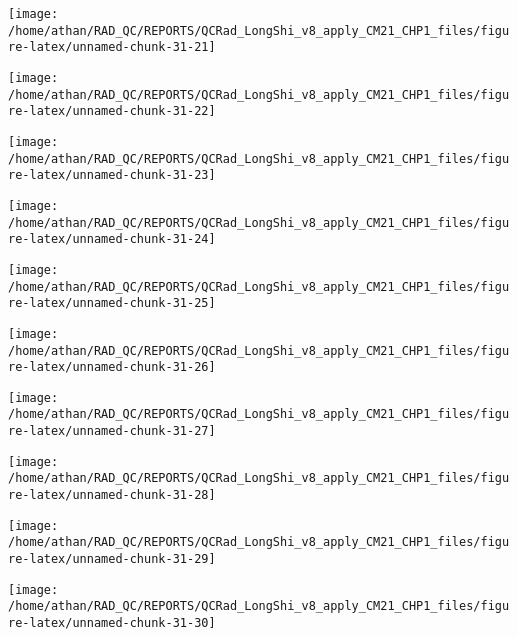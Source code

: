 \documentclass[
  10pt,
  a4paper,oneside]{article}
\begin{document}
\begin{center}\texttt{[image: /home/athan/RAD\_QC/REPORTS/QCRad\_LongShi\_v8\_apply\_CM21\_CHP1\_files/figure-latex/unnamed-chunk-31-21]} \end{center}

\begin{center}\texttt{[image: /home/athan/RAD\_QC/REPORTS/QCRad\_LongShi\_v8\_apply\_CM21\_CHP1\_files/figure-latex/unnamed-chunk-31-22]} \end{center}

\begin{center}\texttt{[image: /home/athan/RAD\_QC/REPORTS/QCRad\_LongShi\_v8\_apply\_CM21\_CHP1\_files/figure-latex/unnamed-chunk-31-23]} \end{center}

\begin{center}\texttt{[image: /home/athan/RAD\_QC/REPORTS/QCRad\_LongShi\_v8\_apply\_CM21\_CHP1\_files/figure-latex/unnamed-chunk-31-24]} \end{center}

\begin{center}\texttt{[image: /home/athan/RAD\_QC/REPORTS/QCRad\_LongShi\_v8\_apply\_CM21\_CHP1\_files/figure-latex/unnamed-chunk-31-25]} \end{center}

\begin{center}\texttt{[image: /home/athan/RAD\_QC/REPORTS/QCRad\_LongShi\_v8\_apply\_CM21\_CHP1\_files/figure-latex/unnamed-chunk-31-26]} \end{center}

\begin{center}\texttt{[image: /home/athan/RAD\_QC/REPORTS/QCRad\_LongShi\_v8\_apply\_CM21\_CHP1\_files/figure-latex/unnamed-chunk-31-27]} \end{center}

\begin{center}\texttt{[image: /home/athan/RAD\_QC/REPORTS/QCRad\_LongShi\_v8\_apply\_CM21\_CHP1\_files/figure-latex/unnamed-chunk-31-28]} \end{center}

\begin{center}\texttt{[image: /home/athan/RAD\_QC/REPORTS/QCRad\_LongShi\_v8\_apply\_CM21\_CHP1\_files/figure-latex/unnamed-chunk-31-29]} \end{center}

\begin{center}\texttt{[image: /home/athan/RAD\_QC/REPORTS/QCRad\_LongShi\_v8\_apply\_CM21\_CHP1\_files/figure-latex/unnamed-chunk-31-30]} \end{center}
\end{document}
